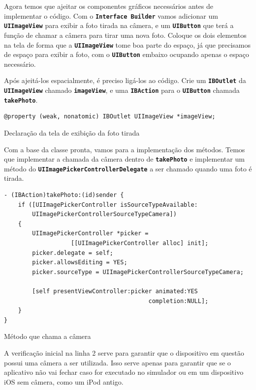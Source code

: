 \documentclass[a4paper,12pt,brazil,doubleside]{book}
\begin{document}
\begin{singlespace}
Agora temos que ajeitar os componentes gráficos necessários antes de implementar o código. Com o \texttt{\textbf{Interface Builder}} vamos adicionar um \texttt{\textbf{UIImageView}} para exibir a foto tirada na câmera, e um \texttt{\textbf{UIButton}} que terá a função de chamar a câmera para tirar uma nova foto. Coloque os dois elementos na tela de forma que a \texttt{\textbf{UIImageView}} tome boa parte do espaço, já que precisamos de espaço para exibir a foto, com o \texttt{\textbf{UIButton}} embaixo ocupando apenas o espaço necessário.

Após ajeitá-los espacialmente, é preciso ligá-los ao código. Crie um \texttt{\textbf{IBOutlet}} da \texttt{\textbf{UIImageView}} chamado \texttt{\textbf{imageView}}, e uma \texttt{\textbf{IBAction}} para o \texttt{\textbf{UIButton}} chamada \texttt{\textbf{takePhoto}}.

\begin{listing}[H]
\begin{verbatim}
@property (weak, nonatomic) IBOutlet UIImageView *imageView;
\end{verbatim}
\caption{Declaração da tela de exibição da foto tirada}
\end{listing}


Com a base da classe pronta, vamos para a implementação dos métodos. Temos que implementar a chamada da câmera dentro de \texttt{\textbf{takePhoto}} e implementar um método do \texttt{\textbf{UIImagePickerControllerDelegate}} a ser chamado quando uma foto é tirada.

\begin{listing}[H]
\begin{verbatim}
- (IBAction)takePhoto:(id)sender {
    if ([UIImagePickerController isSourceTypeAvailable:
        UIImagePickerControllerSourceTypeCamera])
    {
        UIImagePickerController *picker =
                   [[UIImagePickerController alloc] init];
        picker.delegate = self;
        picker.allowsEditing = YES;
        picker.sourceType = UIImagePickerControllerSourceTypeCamera;
        
        [self presentViewController:picker animated:YES
                                         completion:NULL];
    }
}
\end{verbatim}
\caption{Método que chama a câmera}
\end{listing}


A verificação inicial na linha 2 serve para garantir que o dispositivo em questão possui uma câmera a ser utilizada. Isso serve apenas para garantir que se o aplicativo não vai fechar caso for executado no simulador ou em um dispositivo iOS sem câmera, como um iPod antigo.


\end{singlespace}
\end{document}
